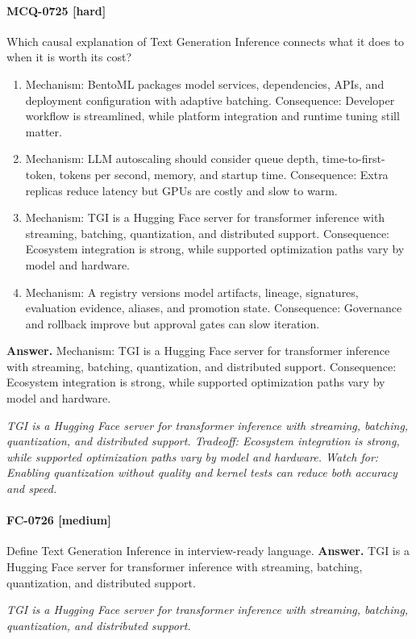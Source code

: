 \paragraph{MCQ-0725 [hard]} Which causal explanation of Text Generation Inference connects what it does to when it is worth its cost?
\begin{enumerate}[label=\Alph*.]
\item Mechanism: BentoML packages model services, dependencies, APIs, and deployment configuration with adaptive batching. Consequence: Developer workflow is streamlined, while platform integration and runtime tuning still matter.
\item Mechanism: LLM autoscaling should consider queue depth, time-to-first-token, tokens per second, memory, and startup time. Consequence: Extra replicas reduce latency but GPUs are costly and slow to warm.
\item Mechanism: TGI is a Hugging Face server for transformer inference with streaming, batching, quantization, and distributed support. Consequence: Ecosystem integration is strong, while supported optimization paths vary by model and hardware.
\item Mechanism: A registry versions model artifacts, lineage, signatures, evaluation evidence, aliases, and promotion state. Consequence: Governance and rollback improve but approval gates can slow iteration.
\end{enumerate}
\noindent\textbf{Answer.} Mechanism: TGI is a Hugging Face server for transformer inference with streaming, batching, quantization, and distributed support. Consequence: Ecosystem integration is strong, while supported optimization paths vary by model and hardware.
\par\textit{TGI is a Hugging Face server for transformer inference with streaming, batching, quantization, and distributed support. Tradeoff: Ecosystem integration is strong, while supported optimization paths vary by model and hardware. Watch for: Enabling quantization without quality and kernel tests can reduce both accuracy and speed.}
\paragraph{FC-0726 [medium]} Define Text Generation Inference in interview-ready language.
\noindent\textbf{Answer.} TGI is a Hugging Face server for transformer inference with streaming, batching, quantization, and distributed support.
\par\textit{TGI is a Hugging Face server for transformer inference with streaming, batching, quantization, and distributed support.}
